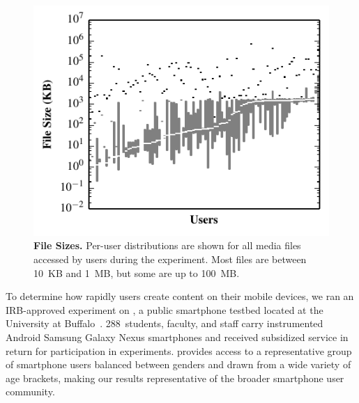 \begin{figure}[t]


\includegraphics{./figures/pocketlocker/FileSizeDistributionGraph.pdf}


\caption{\small \textbf{File Sizes.} Per-user distributions are shown for all
media files accessed by users during the experiment. Most files
are between 10~KB and 1~MB, but some are up to 100~MB.}

\label{fig-motivation-totals}

\vspace*{-0.2in}

\end{figure}
To determine how rapidly users create content on their mobile devices, we ran
an IRB-approved experiment on \PhoneLab{}, a public smartphone testbed located
at the University at Buffalo~\cite{nandugudi2013phonelab}.  288~students,
faculty, and staff carry instrumented Android Samsung Galaxy Nexus smartphones
and received subsidized service in return for participation in experiments.
\PhoneLab{} provides access to a representative group of smartphone users
balanced between genders and drawn from a wide variety of age brackets, making
our results representative of the broader smartphone user community.

